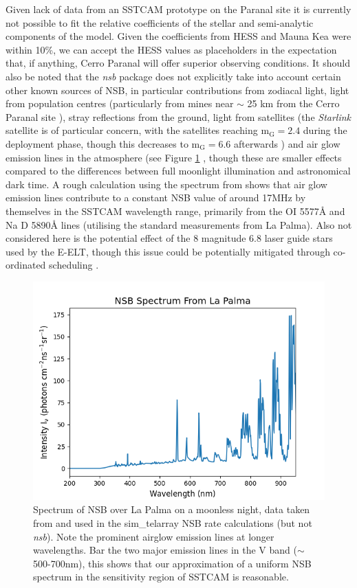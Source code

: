 Given lack of data from an SSTCAM prototype on the Paranal site it is currently not possible to fit the relative coefficients of the stellar and semi-analytic components of the model. Given the coefficients from HESS and Mauna Kea were within 10\%, we can accept the HESS values as placeholders in the expectation that, if anything, Cerro Paranal will offer superior observing conditions. It should also be noted that the \textit{nsb} package does not explicitly take into account certain other known sources of NSB, in particular contributions from zodiacal light, light from population centres (particularly from mines near $\sim$ 25 km from the Cerro Paranal site \cite{cpmines}), stray reflections from the ground, light from satellites (the \textit{Starlink} satellite is of particular concern, with the satellites reaching $\mathrm{m_G=2.4}$ during the deployment phase, though this decreases to $\mathrm{m_G=6.6}$ afterwards \cite{starlink}) and air glow emission lines in the atmosphere (see Figure \ref{fig:BandE} \cite{BandE}, though these are smaller effects compared to the differences between full moonlight illumination and astronomical dark time. A rough calculation using the spectrum from \cite{BandE} shows that air glow emission lines contribute to a constant NSB value of around 17MHz by themselves in the SSTCAM wavelength range, primarily from the OI 5577\r{A} and Na D 5890\r{A} lines (utilising the standard \cite{BandE} measurements from La Palma). Also not considered here is the potential effect of the 8 magnitude 6.8 laser guide stars used by the E-ELT, though this issue could be potentially mitigated through co-ordinated scheduling \cite{gauglasers}. 
\begin{figure}[ht]
\begin{centering}
\includegraphics[width=\columnwidth]{./figures/bandeplot.png}
\caption{Spectrum of NSB over La Palma on a moonless night, data taken from \cite{BandE} and used in the sim\_telarray NSB rate calculations (but not \textit{nsb}). Note the prominent airglow emission lines at longer wavelengths. Bar the two major emission lines in the V band ($\sim$ 500-700nm), this shows that our approximation of a uniform NSB spectrum in the sensitivity region of SSTCAM is reasonable.}
\label{fig:BandE}
\end{centering}
\end{figure}

